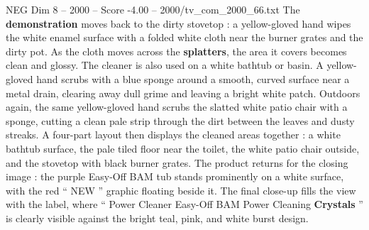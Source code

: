 \begin{textsample}{NEG Dim 8 – 2000 – Score -4.00 – 2000/tv\_com\_2000\_66.txt}
The \textbf{demonstration} moves back to the dirty stovetop : a yellow-gloved hand wipes the white enamel surface with a folded white cloth near the burner grates and the dirty pot.
As the cloth moves across the \textbf{splatters}, the area it covers becomes clean and glossy.
The cleaner is also used on a white bathtub or basin.
A yellow-gloved hand scrubs with a blue sponge around a smooth, curved surface near a metal drain, clearing away dull grime and leaving a bright white patch.
Outdoors again, the same yellow-gloved hand scrubs the slatted white patio chair with a sponge, cutting a clean pale strip through the dirt between the leaves and dusty streaks.
A four-part layout then displays the cleaned areas together : a white bathtub surface, the pale tiled floor near the toilet, the white patio chair outside, and the stovetop with black burner grates.
The product returns for the closing image : the purple Easy-Off BAM tub stands prominently on a white surface, with the red “ NEW ” graphic floating beside it.
The final close-up fills the view with the label, where “ Power Cleaner Easy-Off BAM Power Cleaning \textbf{Crystals} ” is clearly visible against the bright teal, pink, and white burst design.

\end{textsample}
